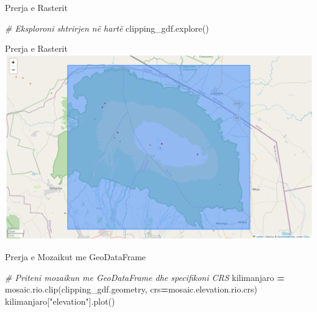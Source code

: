 \documentclass[
  ignorenonframetext,
]{beamer}
\newenvironment{Shaded}{\begin{snugshade}}{\end{snugshade}}
\newcommand{\CommentTok}[1]{\textcolor[rgb]{0.56,0.35,0.01}{\textit{#1}}}
\newcommand{\NormalTok}[1]{#1}
\newcommand{\OperatorTok}[1]{\textcolor[rgb]{0.81,0.36,0.00}{\textbf{#1}}}
\newcommand{\StringTok}[1]{\textcolor[rgb]{0.31,0.60,0.02}{#1}}
\begin{document}
\begin{frame}[fragile]{Prerja e Rasterit}
\protect\hypertarget{prerja-e-rasterit-2}{}

\begin{Shaded}
\begin{Highlighting}[]
\CommentTok{\# Eksploroni shtrirjen në hartë}
\NormalTok{clipping\_gdf.explore()}
\end{Highlighting}
\end{Shaded}
\end{frame}

\begin{frame}{Prerja e Rasterit}
\protect\hypertarget{prerja-e-rasterit-3}{}
\includegraphics{./Figs/mosaic2.png}
\end{frame}

\begin{frame}[fragile]{Prerja e Mozaikut me GeoDataFrame}
\protect\hypertarget{prerja-e-mozaikut-me-geodataframe}{}

\begin{Shaded}
\begin{Highlighting}[]
\CommentTok{\# Priteni mozaikun me GeoDataFrame dhe specifikoni CRS}
\NormalTok{kilimanjaro }\OperatorTok{=}\NormalTok{ mosaic.rio.clip(clipping\_gdf.geometry, crs}\OperatorTok{=}\NormalTok{mosaic.elevation.rio.crs)}
\NormalTok{kilimanjaro[}\StringTok{"elevation"}\NormalTok{].plot()}
\end{Highlighting}
\end{Shaded}
\end{frame}
\end{document}
